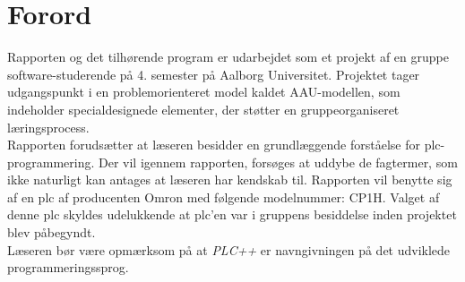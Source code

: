 \section*{Forord}
\label{sec:forord}
Rapporten og det tilhørende program er udarbejdet som et projekt af en gruppe software-studerende på 4. semester på Aalborg Universitet. Projektet tager udgangspunkt i en problemorienteret model kaldet AAU-modellen, som indeholder specialdesignede elementer, der støtter en gruppeorganiseret læringsprocess. \\

\noindent Rapporten forudsætter at læseren besidder en grundlæggende forståelse for \gls{plc}-programmering. Der vil igennem rapporten, forsøges at uddybe de fagtermer, som ikke naturligt kan antages at læseren har kendskab til. Rapporten vil benytte sig af en \gls{plc} af producenten Omron med følgende modelnummer: CP1H. Valget af denne \gls{plc} skyldes udelukkende at \gls{plc}'en var i gruppens besiddelse inden projektet blev påbegyndt. \\

\noindent Læseren bør være opmærksom på at \textit{PLC++} er navngivningen på det udviklede programmeringssprog.